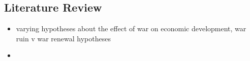 \subsection{Literature Review}
\label{lit}

\begin{itemize}
	\item varying hypotheses about the effect of war on economic development, war ruin v war renewal hypotheses
	\item 
\end{itemize}